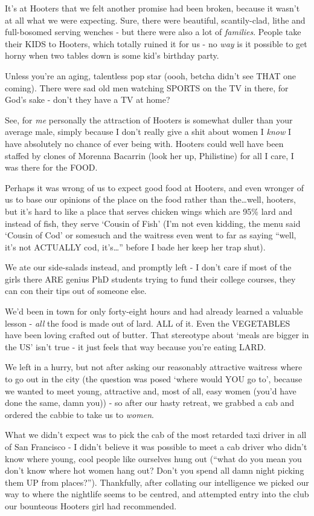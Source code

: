 \documentclass[a5paper,titlepage,draft]{book}
\begin{document}
It's at Hooters that we felt another promise had been broken, because it wasn't at all what we were expecting.  Sure, there were beautiful, scantily-clad, lithe and full-bosomed serving wenches - but there were also a lot of \emph{families}.  People take their KIDS to Hooters, which totally ruined it for us - no \emph{way} is it possible to get horny when two tables down is some kid's birthday party.

Unless you're an aging, talentless pop star (oooh, betcha didn't see THAT one coming).  There were sad old men watching SPORTS on the TV in there, for God's sake - don't they have a TV at home?

See, for \emph{me} personally the attraction of Hooters is somewhat duller than your average male, simply because I don't really give a shit about women I \emph{know} I have absolutely no chance of ever being with.  Hooters could well have been staffed by clones of Morenna Bacarrin (look her up, Philistine) for all I care, I was there for the FOOD.

Perhaps it was wrong of us to expect good food at Hooters, and even wronger of us to base our opinions of the place on the food rather than the\ldots well, hooters, but it's hard to like a place that serves chicken wings which are 95\% lard and instead of fish, they serve `Cousin of Fish' (I'm not even kidding, the menu said `Cousin of Cod' or somesuch and the waitress even went to far as saying ``well, it's not ACTUALLY cod, it's\ldots'' before I bade her keep her trap shut).

We ate our side-salads instead, and promptly left - I don't care if most of the girls there ARE genius PhD students trying to fund their college courses, they can con their tips out of someone else.

We'd been in town for only forty-eight hours and had already learned a valuable lesson - \emph{all} the food is made out of lard.  ALL of it.  Even the VEGETABLES have been loving crafted out of butter.  That stereotype about `meals are bigger in the US' isn't true - it just feels that way because you're eating LARD.

We left in a hurry, but not after asking our reasonably attractive waitress where to go out in the city (the question was posed `where would YOU go to', because we wanted to meet young, attractive and, most of all, easy women (you'd have done the same, damn you)) - so after our hasty retreat, we grabbed a cab and ordered the cabbie to take us to \emph{women}.

What we didn't expect was to pick the cab of the most retarded taxi driver in all of San Francisco - I didn't believe it was possible to meet a cab driver who didn't know where young, cool people like ourselves hung out (``what do you mean you don't know where hot women hang out?  Don't you spend all damn night picking them UP from places?'').  Thankfully, after collating our intelligence we picked our way to where the nightlife seems to be centred, and attempted entry into the club our bounteous Hooters girl had recommended.
\end{document}
